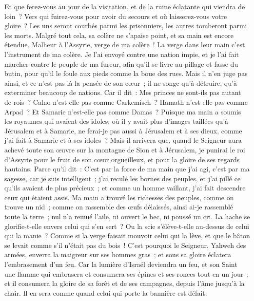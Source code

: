 \begin{multicols}{2}
Et que ferez-vous au jour de la visitation, et de la ruine éclatante qui viendra de loin~? Vers qui fuirez-vous pour avoir du secours et où laisserez-vous votre gloire~?
Les uns seront courbés parmi les prisonniers, les autres tomberont parmi les morts. Malgré tout cela, sa colère ne s'apaise point, et sa main est encore étendue.
Malheur à l'Assyrie, verge de ma colère~! La verge dans leur main c'est l'instrument de ma colère.
Je l'ai envoyé contre une nation impie, et je l'ai fait marcher contre le peuple de ma fureur, afin qu'il se livre au pillage et fasse du butin, pour qu'il le foule aux pieds comme la boue des rues.
Mais il n'en juge pas ainsi, et ce n'est pas là la pensée de son cœur~; il ne songe qu'à détruire, qu'à exterminer beaucoup de nations.
Car il dit~: Mes princes ne sont-ils pas autant de rois~?
Calno n'est-elle pas comme Carkemisch~? Hamath n'est-elle pas comme Arpad~? Et Samarie n'est-elle pas comme Damas~?
Puisque ma main a soumis les royaumes qui avaient des idoles, où il y avait plus d'images taillées qu'à Jérusalem et à Samarie,
ne ferai-je pas aussi à Jérusalem et à ses dieux, comme j'ai fait à Samarie et à ses idoles~?
Mais il arrivera que, quand le Seigneur aura achevé toute son œuvre sur la montagne de Sion et à Jérusalem, je punirai le roi d'Assyrie pour le fruit de son cœur orgueilleux, et pour la gloire de ses regards hautains.
Parce qu'il dit~: C'est par la force de ma main que j'ai agi, c'est par ma sagesse, car je suis intelligent~; j'ai reculé les bornes des peuples, et j'ai pillé ce qu'ils avaient de plus précieux~; et comme un homme vaillant, j'ai fait descendre ceux qui étaient assis.
Ma main a trouvé les richesses des peuples, comme on trouve un nid~; comme on rassemble des œufs délaissés, ainsi ai-je rassemblé toute la terre~; nul n'a remué l'aile, ni ouvert le bec, ni poussé un cri.
La hache se glorifie-t-elle envers celui qui s'en sert~? Ou la scie s'élève-t-elle au-dessus de celui qui la manie~? Comme si la verge faisait mouvoir celui qui la lève, et que le bâton se levait comme s'il n'était pas du bois~!
C'est pourquoi le Seigneur, Yahweh des armées, enverra la maigreur sur ses hommes gras~; et sous sa gloire éclatera l'embrasement d'un feu.
Car la lumière d'Israël deviendra un feu, et son Saint une flamme qui embrasera et consumera ses épines et ses ronces tout en un jour~;
et il consumera la gloire de sa forêt et de ses campagnes, depuis l'âme jusqu'à la chair. Il en sera comme quand celui qui porte la bannière est défait.

\end{multicols}
